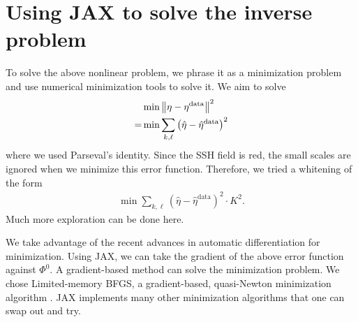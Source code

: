 \documentclass[11pt,letterpaper]{article}
\begin{document}
\section{Using JAX to solve the inverse problem}
To solve the above nonlinear problem, we phrase it as a minimization problem and use numerical minimization tools to solve it. We aim to solve
\begin{align}
    &\min \left\Vert \eta-\eta^\text{data} \right\Vert^2\\
    =&\min \sum_{k,\ell}\left(\hat\eta-\hat\eta^\text{data}\right)^2
\end{align}
where we used Parseval's identity. Since the SSH field is red, the small scales are ignored when we minimize this error function. Therefore, we tried a whitening of the form
\begin{align}
    \min \sum_{k,\ell}\left(\hat\eta-\hat\eta^\text{data}\right)^2\cdot K^2.
\end{align}
Much more exploration can be done here.

We take advantage of the recent advances in automatic differentiation for minimization. Using JAX, we can take the gradient of the above error function against $\Phi^0$. A gradient-based method can solve the minimization problem. We chose Limited-memory BFGS, a gradient-based, quasi-Newton minimization algorithm \citep{LiuNocedal_89}. JAX implements many other minimization algorithms that one can swap out and try. 





\vfill


\end{document}
